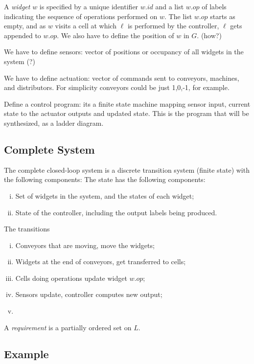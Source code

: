\documentclass[9pt,conference, compsocconf]{IEEEtran}
\begin{document}
A {\em widget} $w$ is specified by a unique identifier $\mathit{w.id}$ and a list $\mathit{w.op}$ of labels indicating the sequence of operations performed on $w$. The list $\mathit{w.op}$ starts as empty, and as $w$ visits a cell at which $\ell$ is performed by the controller, $\ell$ gets appended to $\mathit{w.op}$.
%
We also have to define the position of $w$ in $G$. (how?)

We have to define sensors: vector of positions or occupancy of all widgets in the system (?) 

We have to define actuation: vector of commands sent to conveyors, machines, and distributors.
For simplicity conveyors could be just 1,0,-1, for example.

Define a control program: its a finite state machine mapping sensor input, current state to the actuator outputs and updated state. 
This is the program that will be synthesized, as a ladder diagram.

\subsection{Complete System}
\label{sec:complte}
The complete  closed-loop system is a discrete transition system (finite state) with the following components:
The state has the following components:
\begin{enumerate}[(i)]
\item Set of widgets in the system, and the states of each widget;
\item State of the controller, including the output labels being produced.
\end{enumerate}
The transitions 
\begin{enumerate}[(i)]
	\item Conveyors that are moving, move the widgets;
	\item Widgets at the end of conveyors, get transferred to cells;
	\item Cells doing operations update widget $\mathit{w.op}$;
	\item Sensors update, controller computes new output;
	\item 
\end{enumerate}


A {\em requirement\/} is a partially ordered set on $L$.

\subsection{Example}
\end{document}

